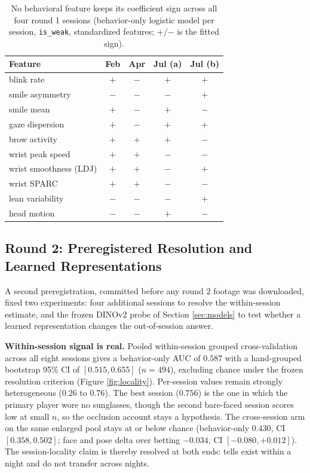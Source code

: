\documentclass[conference]{IEEEtran}
\begin{document}
\begin{table}[t]
\centering
\footnotesize
\caption{No behavioral feature keeps its coefficient sign across all
four round 1 sessions (behavior-only logistic model per session,
\texttt{is\_weak}, standardized features; $+$/$-$ is the fitted sign).}
\label{tab:signs}
\begin{tabular}{lcccc}
\toprule
Feature & Feb & Apr & Jul (a) & Jul (b) \\
\midrule
blink rate & $+$ & $-$ & $+$ & $+$ \\
smile asymmetry & $-$ & $-$ & $-$ & $+$ \\
smile mean & $+$ & $-$ & $+$ & $-$ \\
gaze dispersion & $+$ & $-$ & $+$ & $+$ \\
brow activity & $+$ & $+$ & $+$ & $-$ \\
wrist peak speed & $+$ & $+$ & $-$ & $-$ \\
wrist smoothness (LDJ) & $+$ & $+$ & $-$ & $+$ \\
wrist SPARC & $+$ & $+$ & $-$ & $-$ \\
lean variability & $-$ & $-$ & $-$ & $+$ \\
head motion & $-$ & $-$ & $+$ & $-$ \\
\bottomrule
\end{tabular}
\end{table}

\subsection{Round 2: Preregistered Resolution and Learned Representations}
\label{sec:round2}

A second preregistration, committed before any round 2 footage was
downloaded, fixed two experiments: four additional sessions to resolve
the within-session estimate, and the frozen DINOv2 probe of Section
\ref{sec:models} to test whether a learned representation changes the
out-of-session answer.

\textbf{Within-session signal is real.} Pooled within-session grouped
cross-validation across all eight sessions gives a behavior-only AUC of
$0.587$ with a hand-grouped bootstrap 95\% CI of $[0.515, 0.655]$
($n=494$), excluding chance under the frozen resolution criterion
(Figure \ref{fig:locality}). Per-session values remain strongly
heterogeneous ($0.26$ to $0.76$). The best session ($0.756$) is the one
in which the primary player wore no sunglasses, though the second
bare-faced session scores low at small $n$, so the occlusion account
stays a hypothesis. The cross-session arm on the same enlarged pool
stays at or below chance (behavior-only $0.430$, CI $[0.358, 0.502]$;
face and pose delta over betting $-0.034$, CI $[-0.080, +0.012]$). The
session-locality claim is thereby resolved at both ends: tells exist
within a night and do not transfer across nights.
\end{document}
